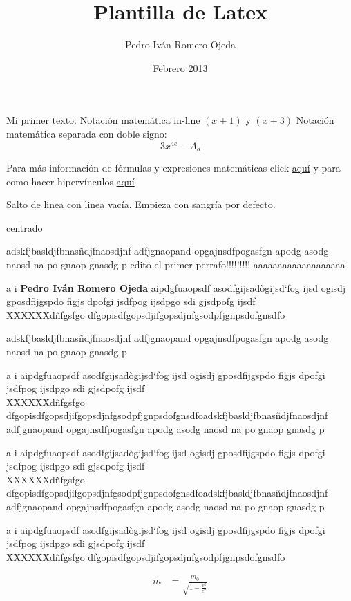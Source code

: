 \documentclass[12pt]{article}
\title{Plantilla de Latex}
\author{Pedro Iván Romero Ojeda}
\date{Febrero 2013}
\begin{document}
\maketitle
Mi primer texto. Notación matemática in-line $(x+1)$ y $(x+3)$ Notación matemática separada con doble signo: $$3x^{4e} - A_b$$

Para más información de fórmulas y expresiones matemáticas click \href{http://en.wikibooks.org/wiki/LaTeX/Mathematics}{aquí} y para como hacer hipervínculos \href{http://en.wikibooks.org/wiki/LaTeX/Hyperlinks}{aquí}

Salto de linea con linea vacía. Empieza con sangría por defecto.
\begin{center}
centrado %
\end{center}


adskfjbasldjfbnasñdjfnaosdjnf adfjgnaopand opgajnsdfpogasfgn apodg asodg naosd na po gnaop gnasdg p edito el primer perrafo!!!!!!!!! aaaaaaaaaaaaaaaaaaa

a i \textbf{Pedro Iván Romero Ojeda} aipdgfuaopsdf asodfgijsadògijsd`fog ijsd ogisdj gposdfijgspdo figjs dpofgi jsdfpog ijsdpgo sdi gjsdpofg ijsdf\\
XXXXXXdñfgsfgo dfgopisdfgopsdjifgopsdjnfgsodpfjgnpsdofgnsdfo

adskfjbasldjfbnasñdjfnaosdjnf adfjgnaopand opgajnsdfpogasfgn apodg asodg naosd na po gnaop gnasdg p

a i aipdgfuaopsdf asodfgijsadògijsd`fog ijsd ogisdj gposdfijgspdo figjs dpofgi jsdfpog ijsdpgo sdi gjsdpofg ijsdf\\
XXXXXXdñfgsfgo dfgopisdfgopsdjifgopsdjnfgsodpfjgnpsdofgnsdfoadskfjbasldjfbnasñdjfnaosdjnf adfjgnaopand opgajnsdfpogasfgn apodg asodg naosd na po gnaop gnasdg p

a i aipdgfuaopsdf asodfgijsadògijsd`fog ijsd ogisdj gposdfijgspdo figjs dpofgi jsdfpog ijsdpgo sdi gjsdpofg ijsdf\\
XXXXXXdñfgsfgo dfgopisdfgopsdjifgopsdjnfgsodpfjgnpsdofgnsdfoadskfjbasldjfbnasñdjfnaosdjnf adfjgnaopand opgajnsdfpogasfgn apodg asodg naosd na po gnaop gnasdg p

a i aipdgfuaopsdf asodfgijsadògijsd`fog ijsd ogisdj gposdfijgspdo figjs dpofgi jsdfpog ijsdpgo sdi gjsdpofg ijsdf\\
XXXXXXdñfgsfgo dfgopisdfgopsdjifgopsdjnfgsodpfjgnpsdofgnsdfo

\begin{align}
m &= \frac{m_0}{\sqrt{1-\frac{v^2}{c^2}}}
\end{align}
\end{document}
